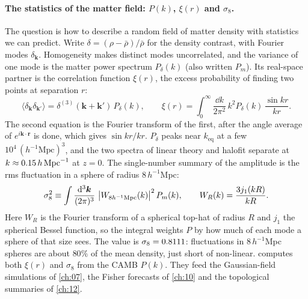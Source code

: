 \paragraph{The statistics of the matter field: $P(k)$, $\xi(r)$ and $\sigma_8$.}
The question is how to describe a random field of matter density with statistics we can predict. Write $\delta=(\rho-\bar\rho)/\bar\rho$ for the density contrast, with Fourier modes $\delta_{\bm k}$. Homogeneity makes distinct modes uncorrelated, and the variance of one mode is the matter power spectrum $P_\delta(k)$ (also written $P_m$). Its real-space partner is the correlation function $\xi(r)$, the excess probability of finding two points at separation $r$:
\begin{equation*}
\langle\delta_{\bm k}\delta_{\bm k'}\rangle=\delta^{(3)}(\bm k+\bm k')\,P_\delta(k),
\qquad
\xi(r)=\int_0^\infty\frac{\dd k}{2\pi^2}\,k^2P_\delta(k)\,\frac{\sin kr}{kr}.
\end{equation*}
The second equation is the Fourier transform of the first, after the angle average of $e^{i\bm k\cdot\bm r}$ is done, which gives $\sin kr/kr$. $P_\delta$ peaks near $k_{\mathrm{eq}}$ at a few $10^4\,(h^{-1}\mathrm{Mpc})^3$, and the two spectra of linear theory and halofit separate at $k\approx0.15\,h\,\mathrm{Mpc}^{-1}$ at $z=0$. The single-number summary of the amplitude is the rms fluctuation in a sphere of radius $8\,h^{-1}$Mpc:
\begin{equation*}
\sigma_8^2\equiv\int\frac{\mathrm{d}^3\bm k}{(2\pi)^3}\,\left\lvert W_{8h^{-1}\mathrm{Mpc}}(k)\right\rvert^2P_m(k),
\qquad
W_R(k)=\frac{3j_1(kR)}{kR}.
\end{equation*}
Here $W_R$ is the Fourier transform of a spherical top-hat of radius $R$ and $j_1$ the spherical Bessel function, so the integral weights $P$ by how much of each mode a sphere of that size sees. The value is $\sigma_8=0.8111$: fluctuations in $8\,h^{-1}$Mpc spheres are about $80\%$ of the mean density, just short of non-linear.  computes both $\xi(r)$ and $\sigma_8$ from the CAMB $P(k)$. They feed the Gaussian-field simulations of \cref{ch:07}, the Fisher forecasts of \cref{ch:10} and the topological summaries of \cref{ch:12}.

